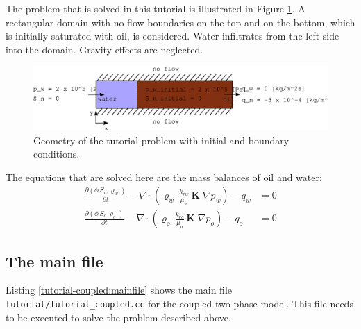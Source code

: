 The problem that is solved in this tutorial is illustrated in Figure \ref{tutorial-coupled:problemfigure}. A rectangular domain with no flow boundaries on the top and on the bottom, which is initially saturated with oil, is considered. Water infiltrates from the left side into the domain. Gravity effects are neglected.

\begin{figure}[h]
\centering
\includegraphics[width=0.9\linewidth,keepaspectratio]{EPS/tutorial-problemconfiguration}
\caption{Geometry of the tutorial problem with initial and boundary conditions.}\label{tutorial-coupled:problemfigure}
\end{figure}

The equations that are solved here are the mass balances of oil and
water:
\begin{align}
  \label{massbalancewater}
  \frac {\partial (\phi \, S_{w}\, \varrho_{w})}{\partial t}
  -
  \nabla \cdot \left( \varrho_{w} \, \frac{k_{rw}}{\mu_{w}} \, \mathbf{K}\;\nabla p_w \right)
  -
  q_w
  & =
  0 \\
  \label{massbalanceoil}
  \frac {\partial (\phi \, S_{o}\, \varrho_{o})}{\partial t}
  -
  \nabla \cdot \left( \varrho_{o} \, \frac{k_{ro}}{\mu_{o}} \, \mathbf{K}\;\nabla p_o \right)
  -
  q_o 
  & =
  0
\end{align}

\subsection{The main file}

Listing \ref{tutorial-coupled:mainfile} shows the main file
\texttt{tutorial/tutorial\_coupled.cc} for the coupled two-phase
model. This file needs to be executed to solve the problem described
above.

